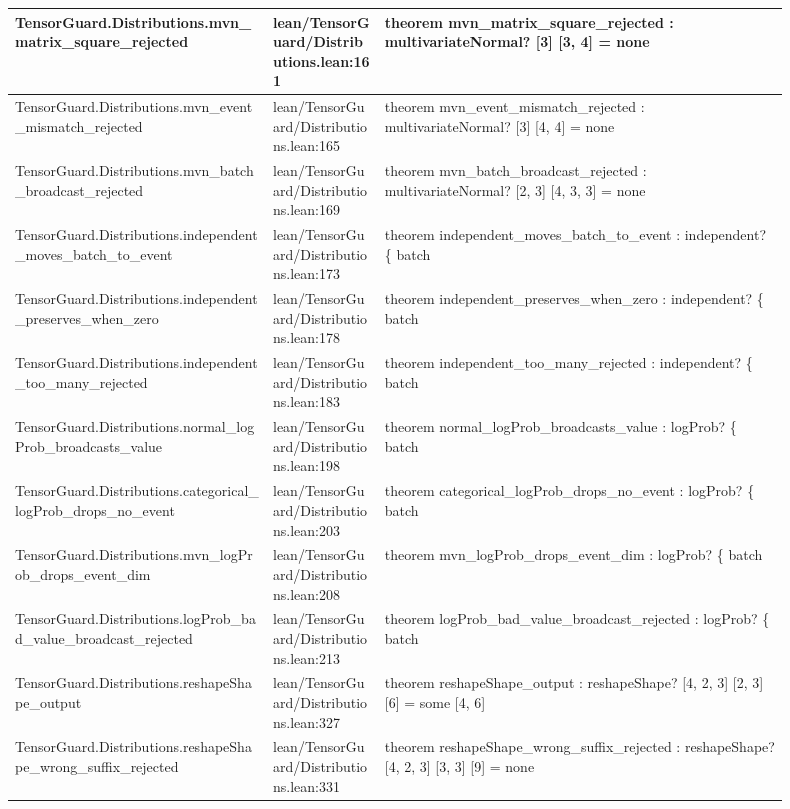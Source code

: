 \documentclass[10pt]{article}
\begin{document}
\begin{longtable}{|p{0.30\linewidth}|p{0.13\linewidth}|p{0.47\linewidth}|}
\hline
TensorGuard.Distributions.mvn\_matrix\_square\_rejected & lean/TensorGuard/Distributions.lean:161 & theorem mvn\_matrix\_square\_rejected : multivariateNormal? [3] [3, 4] = none \\
\hline
TensorGuard.Distributions.mvn\_event\_mismatch\_rejected & lean/TensorGuard/Distributions.lean:165 & theorem mvn\_event\_mismatch\_rejected : multivariateNormal? [3] [4, 4] = none \\
\hline
TensorGuard.Distributions.mvn\_batch\_broadcast\_rejected & lean/TensorGuard/Distributions.lean:169 & theorem mvn\_batch\_broadcast\_rejected : multivariateNormal? [2, 3] [4, 3, 3] = none \\
\hline
TensorGuard.Distributions.independent\_moves\_batch\_to\_event & lean/TensorGuard/Distributions.lean:173 & theorem independent\_moves\_batch\_to\_event : independent? \{ batch \\
\hline
TensorGuard.Distributions.independent\_preserves\_when\_zero & lean/TensorGuard/Distributions.lean:178 & theorem independent\_preserves\_when\_zero : independent? \{ batch \\
\hline
TensorGuard.Distributions.independent\_too\_many\_rejected & lean/TensorGuard/Distributions.lean:183 & theorem independent\_too\_many\_rejected : independent? \{ batch \\
\hline
TensorGuard.Distributions.normal\_logProb\_broadcasts\_value & lean/TensorGuard/Distributions.lean:198 & theorem normal\_logProb\_broadcasts\_value : logProb? \{ batch \\
\hline
TensorGuard.Distributions.categorical\_logProb\_drops\_no\_event & lean/TensorGuard/Distributions.lean:203 & theorem categorical\_logProb\_drops\_no\_event : logProb? \{ batch \\
\hline
TensorGuard.Distributions.mvn\_logProb\_drops\_event\_dim & lean/TensorGuard/Distributions.lean:208 & theorem mvn\_logProb\_drops\_event\_dim : logProb? \{ batch \\
\hline
TensorGuard.Distributions.logProb\_bad\_value\_broadcast\_rejected & lean/TensorGuard/Distributions.lean:213 & theorem logProb\_bad\_value\_broadcast\_rejected : logProb? \{ batch \\
\hline
TensorGuard.Distributions.reshapeShape\_output & lean/TensorGuard/Distributions.lean:327 & theorem reshapeShape\_output : reshapeShape? [4, 2, 3] [2, 3] [6] = some [4, 6] \\
\hline
TensorGuard.Distributions.reshapeShape\_wrong\_suffix\_rejected & lean/TensorGuard/Distributions.lean:331 & theorem reshapeShape\_wrong\_suffix\_rejected : reshapeShape? [4, 2, 3] [3, 3] [9] = none \\

\end{longtable}
\end{document}
